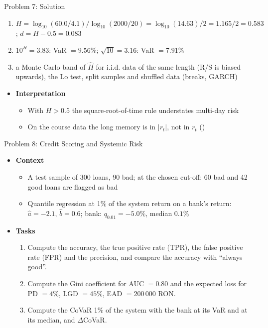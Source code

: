 \begin{frame}{Problem 7: Solution}
\itemsize{\footnotesize}
\begin{enumerate}
    \item $H = \log_{10}(60.0/4.1)/\log_{10}(2000/20) = \log_{10}(14.63)/2 = 1.165/2 = 0.583$; $d = H - 0.5 = 0.083$
    \item $10^{H} = 3.83$: VaR $= 9.56\%$; $\sqrt{10} = 3.16$: VaR $= 7.91\%$
    \item a Monte Carlo band of $\hat H$ for i.i.d. data of the same length (R/S is biased upwards), the Lo test, split samples and shuffled data (breaks, GARCH)
\end{enumerate}
\begin{itemize}
    \item \textbf{Interpretation}
    \begin{itemize}
        \item With $H > 0.5$ the square-root-of-time rule understates multi-day risk
        \item On the course data the long memory is in $|r_t|$, not in $r_t$ ()
    \end{itemize}
\end{itemize}
\end{frame}

\begin{frame}{Problem 8: Credit Scoring and Systemic Risk}
\itemsize{\footnotesize}
\begin{itemize}
    \item \textbf{Context}
    \begin{itemize}
        \item A test sample of 300 loans, 90 bad; at the chosen cut-off: 60 bad and 42 good loans are flagged as bad
        \item Quantile regression at 1\% of the system return on a bank's return: $\hat a = -2.1$, $\hat b = 0.6$; bank: $q_{0.01} = -5.0\%$, median $0.1\%$
    \end{itemize}
    \item \textbf{Tasks}
\begin{enumerate}
    \item Compute the accuracy, the true positive rate (TPR), the false positive rate (FPR) and the precision, and compare the accuracy with ``always good''.
    \item Compute the Gini coefficient for AUC $= 0.80$ and the expected loss for PD $= 4\%$, LGD $= 45\%$, EAD $= 200\,000$ RON.
    \item Compute the CoVaR 1\% of the system with the bank at its VaR and at its median, and $\Delta$CoVaR.
\end{enumerate}
\end{itemize}
\end{frame}

